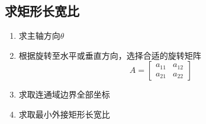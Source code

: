 \subsection{求矩形长宽比}
\begin{enumerate}
	\item 求主轴方向$\theta$
	\item 根据旋转至水平或垂直方向，选择合适的旋转矩阵
	\begin{equation*}
	A
	=
	\left[
	\begin{matrix}
	a_{11} & a_{12}\\
	a_{21} & a_{22}
	\end{matrix}
	\right]	
	\end{equation*}
	\item 求取连通域边界全部坐标
	\item 求取最小外接矩形长宽比
\end{enumerate}
